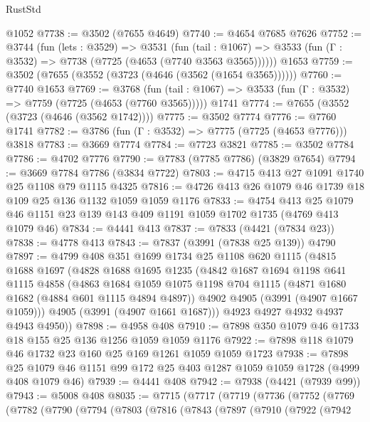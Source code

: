 \begin{lexlean}{RustStd}
\begin{coremodule}
    @1052
@7738 := @3502 (@7655 @4649)
@7740 := @4654 @7685 @7626
@7752 := @3744
    (fun (lets : @3529) =>
    @3531
      (fun (tail : @1067) => @3533 (fun (Γ : @3532) => @7738 (@7725 (@4653 (@7740 @3563 @3565))))))
    @1653
@7759 := @3502 (@7655 (@3552 (@3723 (@4646 (@3562 (@1654 @3565))))))
@7760 := @7740 @1653
@7769 := @3768
    (fun (tail : @1067) => @3533 (fun (Γ : @3532) => @7759 (@7725 (@4653 (@7760 @3565)))))
    @1741
@7774 := @7655 (@3552 (@3723 (@4646 (@3562 @1742))))
@7775 := @3502 @7774
@7776 := @7760 @1741
@7782 := @3786 (fun (Γ : @3532) => @7775 (@7725 (@4653 @7776))) @3818
@7783 := @3669 @7774
@7784 := @7723 @3821
@7785 := @3502 @7784
@7786 := @4702 @7776
@7790 := @7783 (@7785 @7786) (@3829 @7654)
@7794 := @3669 @7784 @7786 (@3834 @7722)
@7803 := @4715 @413 @27 @1091 @1740 @25 @1108 @79 @1115 @4325
@7816 := @4726 @413 @26 @1079 @46 @1739 @18 @109 @25 @136 @1132 @1059 @1059 @1176
@7833 := @4754
    @413
    @25
    @1079
    @46
    @1151
    @23
    @139
    @143
    @409
    @1191
    @1059
    @1702
    @1735
    (@4769 @413 @1079 @46)
@7834 := @4441 @413
@7837 := @7833 (@4421 (@7834 @23))
@7838 := @4778 @413
@7843 := @7837 (@3991 (@7838 @25 @139)) @4790
@7897 := @4799
    @408
    @351
    @1699
    @1734
    @25
    @1108
    @620
    @1115
    (@4815
      @1688
      @1697
      (@4828
        @1688
        @1695
        @1235
        (@4842
          @1687
          @1694
          @1198
          @641
          @1115
          @4858
          (@4863
            @1684
            @1059
            @1075
            @1198
            @704
            @1115
            (@4871 @1680 @1682 (@4884 @601 @1115 @4894 @4897))
            @4902
            @4905
            (@3991 (@4907 @1667 @1059)))
          @4905
          (@3991 (@4907 @1661 @1687)))
        @4923
        @4927
        @4932
        @4937
        @4943
        @4950))
@7898 := @4958 @408
@7910 := @7898 @350 @1079 @46 @1733 @18 @155 @25 @136 @1256 @1059 @1059 @1176
@7922 := @7898 @118 @1079 @46 @1732 @23 @160 @25 @169 @1261 @1059 @1059 @1723
@7938 := @7898 @25 @1079 @46 @1151 @99 @172 @25 @403 @1287 @1059 @1059 @1728 (@4999 @408 @1079 @46)
@7939 := @4441 @408
@7942 := @7938 (@4421 (@7939 @99))
@7943 := @5008 @408
@8035 := @7715
    (@7717
      (@7719
        (@7736
          (@7752
            (@7769
              (@7782
                (@7790
                  (@7794
                    (@7803
                      (@7816
                        (@7843
                          (@7897
                            (@7910
                              (@7922
                                (@7942

\end{coremodule}
\end{lexlean}

